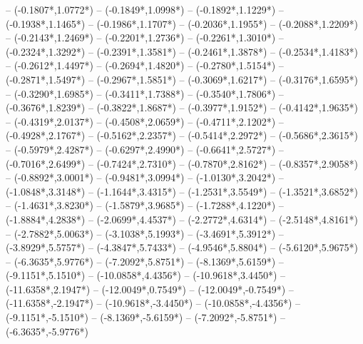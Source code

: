 {	-- ({-0.1807*\dx},{1.0772*\dy})
	-- ({-0.1849*\dx},{1.0998*\dy})
	-- ({-0.1892*\dx},{1.1229*\dy})
	-- ({-0.1938*\dx},{1.1465*\dy})
	-- ({-0.1986*\dx},{1.1707*\dy})
	-- ({-0.2036*\dx},{1.1955*\dy})
	-- ({-0.2088*\dx},{1.2209*\dy})
	-- ({-0.2143*\dx},{1.2469*\dy})
	-- ({-0.2201*\dx},{1.2736*\dy})
	-- ({-0.2261*\dx},{1.3010*\dy})
	-- ({-0.2324*\dx},{1.3292*\dy})
	-- ({-0.2391*\dx},{1.3581*\dy})
	-- ({-0.2461*\dx},{1.3878*\dy})
	-- ({-0.2534*\dx},{1.4183*\dy})
	-- ({-0.2612*\dx},{1.4497*\dy})
	-- ({-0.2694*\dx},{1.4820*\dy})
	-- ({-0.2780*\dx},{1.5154*\dy})
	-- ({-0.2871*\dx},{1.5497*\dy})
	-- ({-0.2967*\dx},{1.5851*\dy})
	-- ({-0.3069*\dx},{1.6217*\dy})
	-- ({-0.3176*\dx},{1.6595*\dy})
	-- ({-0.3290*\dx},{1.6985*\dy})
	-- ({-0.3411*\dx},{1.7388*\dy})
	-- ({-0.3540*\dx},{1.7806*\dy})
	-- ({-0.3676*\dx},{1.8239*\dy})
	-- ({-0.3822*\dx},{1.8687*\dy})
	-- ({-0.3977*\dx},{1.9152*\dy})
	-- ({-0.4142*\dx},{1.9635*\dy})
	-- ({-0.4319*\dx},{2.0137*\dy})
	-- ({-0.4508*\dx},{2.0659*\dy})
	-- ({-0.4711*\dx},{2.1202*\dy})
	-- ({-0.4928*\dx},{2.1767*\dy})
	-- ({-0.5162*\dx},{2.2357*\dy})
	-- ({-0.5414*\dx},{2.2972*\dy})
	-- ({-0.5686*\dx},{2.3615*\dy})
	-- ({-0.5979*\dx},{2.4287*\dy})
	-- ({-0.6297*\dx},{2.4990*\dy})
	-- ({-0.6641*\dx},{2.5727*\dy})
	-- ({-0.7016*\dx},{2.6499*\dy})
	-- ({-0.7424*\dx},{2.7310*\dy})
	-- ({-0.7870*\dx},{2.8162*\dy})
	-- ({-0.8357*\dx},{2.9058*\dy})
	-- ({-0.8892*\dx},{3.0001*\dy})
	-- ({-0.9481*\dx},{3.0994*\dy})
	-- ({-1.0130*\dx},{3.2042*\dy})
	-- ({-1.0848*\dx},{3.3148*\dy})
	-- ({-1.1644*\dx},{3.4315*\dy})
	-- ({-1.2531*\dx},{3.5549*\dy})
	-- ({-1.3521*\dx},{3.6852*\dy})
	-- ({-1.4631*\dx},{3.8230*\dy})
	-- ({-1.5879*\dx},{3.9685*\dy})
	-- ({-1.7288*\dx},{4.1220*\dy})
	-- ({-1.8884*\dx},{4.2838*\dy})
	-- ({-2.0699*\dx},{4.4537*\dy})
	-- ({-2.2772*\dx},{4.6314*\dy})
	-- ({-2.5148*\dx},{4.8161*\dy})
	-- ({-2.7882*\dx},{5.0063*\dy})
	-- ({-3.1038*\dx},{5.1993*\dy})
	-- ({-3.4691*\dx},{5.3912*\dy})
	-- ({-3.8929*\dx},{5.5757*\dy})
	-- ({-4.3847*\dx},{5.7433*\dy})
	-- ({-4.9546*\dx},{5.8804*\dy})
	-- ({-5.6120*\dx},{5.9675*\dy})
	-- ({-6.3635*\dx},{5.9776*\dy})
	-- ({-7.2092*\dx},{5.8751*\dy})
	-- ({-8.1369*\dx},{5.6159*\dy})
	-- ({-9.1151*\dx},{5.1510*\dy})
	-- ({-10.0858*\dx},{4.4356*\dy})
	-- ({-10.9618*\dx},{3.4450*\dy})
	-- ({-11.6358*\dx},{2.1947*\dy})
	-- ({-12.0049*\dx},{0.7549*\dy})
	-- ({-12.0049*\dx},{-0.7549*\dy})
	-- ({-11.6358*\dx},{-2.1947*\dy})
	-- ({-10.9618*\dx},{-3.4450*\dy})
	-- ({-10.0858*\dx},{-4.4356*\dy})
	-- ({-9.1151*\dx},{-5.1510*\dy})
	-- ({-8.1369*\dx},{-5.6159*\dy})
	-- ({-7.2092*\dx},{-5.8751*\dy})
	-- ({-6.3635*\dx},{-5.9776*\dy})
}
